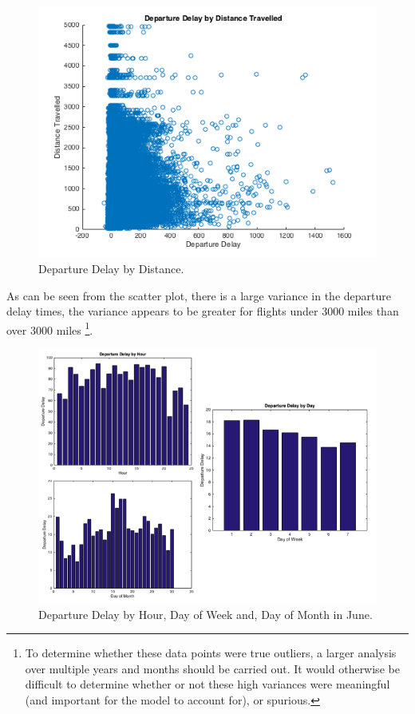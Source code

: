 \documentclass[a4paper, 10pt]{article}
\begin{document}
\begin{figure}[H]
\begin{center}
\includegraphics[scale=0.5]{departureDelayByDistanceTravelled}
\caption{Departure Delay by Distance.}
\label{departureDelayByDistanceTravelled}
\end{center}
\end{figure}

As can be seen from the scatter plot, there is a large variance in the departure delay times, the variance appears to be greater for flights under 3000 miles than over 3000 miles \footnote{To determine whether these data points were true outliers, a larger analysis over multiple years and months should be carried out. It would otherwise be difficult to determine whether or not these high variances were meaningful (and important for the model to account for), or spurious.}. 

\begin{figure}[H]
\begin{center}
\includegraphics[scale=0.5]{explore}
\caption{Departure Delay by Hour, Day of Week and, Day of Month in June.}
\label{explore}
\end{center}
\end{figure}
\end{document}
